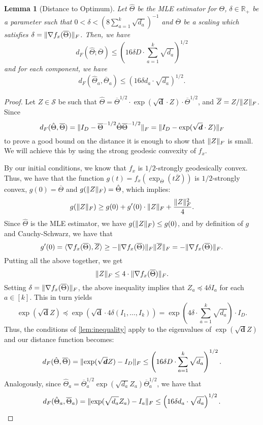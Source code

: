 \documentclass{article}
\newtheorem{lemma}[theorem]{Lemma}
\DeclarePairedDelimiter{\norm}{\lVert}{\rVert}
\newcommand{\R}{{\mathbb{R}}}
\renewcommand{\vec}{\bm}
\newcommand{\otheta}{\overline{\Theta}}
\newcommand{\htheta}{\hat{\Theta}}
\newcommand{\oZ}{\overline{Z}}
\newcommand\Sym{\mathcal{S}}
\begin{document}
\begin{lemma}[Distance to Optimum]\label{lem:tensor-distance-opt}
	Let $\htheta$ be the MLE estimator for $\Theta$, $\delta \in \R_+$ be a parameter such that 
	$0 < \delta < \left(8 \sum_{a=1}^k \sqrt{d_a} \right)^{-1}$ and $\otheta$ be a scaling which satisfies $\delta = \norm{\nabla f_x(\otheta)}_F$. Then, we have
	$$ d_F(\htheta; \otheta) \leq \left( 16 \delta D \cdot \sum_{a=1}^k \sqrt{d_a} \right)^{1/2} $$
	and for each component, we have
	$$ d_F(\htheta_a, \otheta_a) \leq \left( 16 \delta d_a \cdot \sqrt{d_a} \right)^{1/2}. $$
\end{lemma}

\begin{proof}
	Let $Z \in \Sym$ be such that $\htheta = \otheta^{1/2} \cdot \exp(\sqrt{\vec d} \cdot Z) \cdot \otheta^{1/2}$, and $\oZ = Z / \norm{Z}_F$.
	Since 
	$$ d_F(\htheta, \otheta) = \norm{I_D - \otheta^{-1/2} \htheta \otheta^{-1/2}}_F = \norm{I_D - \exp(\sqrt{\vec d} \cdot Z)}_F $$
	to prove a good bound on the distance it is enough to show that $\norm{Z}_F$ is small. 
	We will achieve this by using the strong geodesic convexity of $f_x$.
	
	By our initial conditions, we know that $f_x$ is $1/2$-strongly geodesically convex. 
	Thus, we have that the function $g(t) = f_x(\exp_{\otheta} (t \oZ) )$ is $1/2$-strongly convex, $g(0) = \otheta$ and $g(\norm{Z}_F) = \htheta$, which implies:
	$$ g(\norm{Z}_F) \geq g(0) + g'(0) \cdot \norm{Z}_F + \frac{\norm{Z}_F^2}{4}. $$
	Since $\htheta$ is the MLE estimator, we have $g(\norm{Z}_F) \leq g(0)$, and by definition of
	$g$ and Cauchy-Schwarz, we have that 
	$$ g'(0) = \langle \nabla f_x(\otheta), \oZ \rangle \geq - \norm{\nabla f_x(\otheta)}_F \norm{\oZ}_F = - \norm{\nabla f_x(\otheta)}_F. $$
	Putting all the above together, we get 
	$$ \norm{Z}_F \leq 4 \cdot \norm{\nabla f_x(\otheta)}_F. $$ 
	Setting $\delta = \norm{\nabla f_x(\otheta)}_F$, the above inequality implies that $Z_a \preceq 4 \delta I_a$ for each $a \in [k]$. This in turn yields 
	$$ \exp(\sqrt{\vec d} Z) \preceq \exp(\sqrt{\vec d} \cdot 4\delta (I_1, \dots, I_k)) = 
	\exp\left(4 \delta \cdot \sum_{a=1}^k \sqrt{d_a} \right) \cdot I_D. $$
	Thus, the conditions of \cref{lem:inequality} apply to the eigenvalues of $\exp(\sqrt{\vec d} Z)$ and our distance function becomes:
	$$ d_F(\htheta, \otheta) =  \norm{\exp(\sqrt{\vec d} Z) - I_D}_F \leq \left( 16 \delta D \cdot \sum_{a=1}^k \sqrt{d_a} \right)^{1/2}. $$
	Analogously, since $\htheta_a = \otheta^{1/2}_a \exp(\sqrt{d_a} Z_a) \otheta^{1/2}_a$, we have that
	$$ d_F(\htheta_a, \otheta_a) =  \norm{\exp(\sqrt{d_a} Z_a) - I_a}_F \leq \left( 16 \delta d_a \cdot \sqrt{d_a} \right)^{1/2}. $$
\end{proof}
\end{document}

